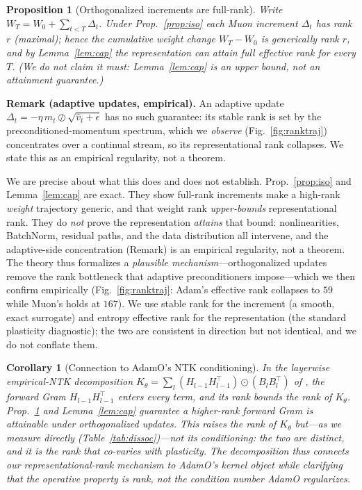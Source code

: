 \documentclass[letterpaper]{article} %
\newtheorem{proposition}{Proposition}
\newtheorem{corollary}{Corollary}
\begin{document}
\begin{proposition}[Orthogonalized increments are full-rank]\label{prop:traj}
Write $W_T=W_0+\sum_{t<T}\Delta_t$. Under Prop.~\ref{prop:iso} each Muon increment $\Delta_t$ has rank $r$ (maximal); hence the cumulative weight change $W_T-W_0$ is generically rank $r$, and by Lemma~\ref{lem:cap} the representation \emph{can} attain full effective rank for every $T$. (We do not claim it must: Lemma~\ref{lem:cap} is an upper bound, not an attainment guarantee.)
\end{proposition}
\noindent\textbf{Remark (adaptive updates, empirical).} An adaptive update $\Delta_t=-\eta\,\hat m_t\oslash\sqrt{\hat v_t+\epsilon}$ has no such guarantee: its stable rank is set by the preconditioned-momentum spectrum, which we \emph{observe} (Fig.~\ref{fig:ranktraj}) concentrates over a continual stream, so its representational rank collapses. We state this as an empirical regularity, not a theorem.

We are precise about what this does and does not establish. Prop.~\ref{prop:iso} and Lemma~\ref{lem:cap} are exact. They show full-rank increments make a high-rank \emph{weight} trajectory generic, and that weight rank \emph{upper-bounds} representational rank. They do \emph{not} prove the representation \emph{attains} that bound: nonlinearities, BatchNorm, residual paths, and the data distribution all intervene, and the adaptive-side concentration (Remark) is an empirical regularity, not a theorem. The theory thus formalizes a \emph{plausible mechanism}---orthogonalized updates remove the rank bottleneck that adaptive preconditioners impose---which we then confirm empirically (Fig.~\ref{fig:ranktraj}: Adam's effective rank collapses to $59$ while Muon's holds at $167$). We use stable rank for the increment (a smooth, exact surrogate) and entropy effective rank for the representation (the standard plasticity diagnostic); the two are consistent in direction but not identical, and we do not conflate them.

\begin{corollary}[Connection to AdamO's NTK conditioning]\label{cor:ntk}
In the layerwise empirical-NTK decomposition $K_\theta=\sum_l (H_{l-1}H_{l-1}^\top)\odot(B_{l}B_{l}^\top)$ of \citet{adamo2026}, the forward Gram $H_{l-1}H_{l-1}^\top$ enters every term, and its \emph{rank} bounds the rank of $K_\theta$. Prop.~\ref{prop:traj} and Lemma~\ref{lem:cap} guarantee a higher-rank forward Gram is attainable under orthogonalized updates. This raises the \emph{rank} of $K_\theta$ but---as we measure directly (Table~\ref{tab:dissoc})---not its conditioning: the two are distinct, and it is the rank that co-varies with plasticity. The decomposition thus connects our representational-rank mechanism to AdamO's kernel object while clarifying that the operative property is rank, not the condition number AdamO regularizes.
\end{corollary}
\end{document}
